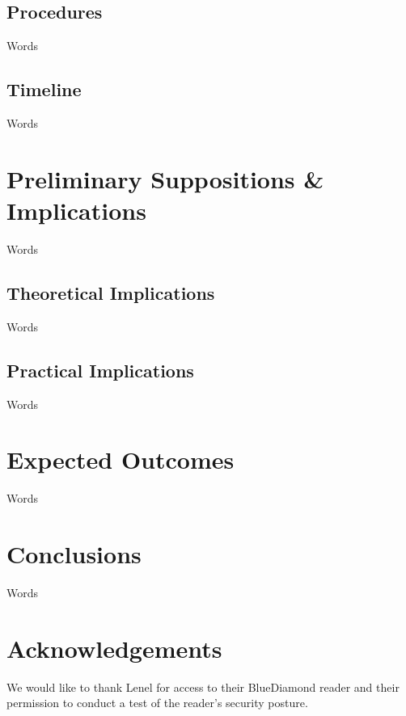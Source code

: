 \documentclass[10pt,twocolumn,letterpaper]{article}
\begin{document}
\subsection{Procedures}
Words

\subsection{Timeline}
Words

\section{Preliminary Suppositions \& Implications}
Words

\subsection{Theoretical Implications}
Words

\subsection{Practical Implications}
Words

\section{Expected Outcomes}
Words

\section{Conclusions}
Words

\section{Acknowledgements}
We would like to thank Lenel for access to their BlueDiamond reader and their permission to conduct a test of the reader's security posture.



\end{document}
